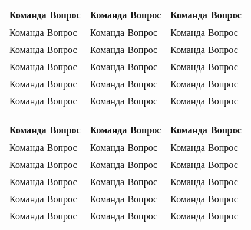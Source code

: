 
\usepackage{multicol}
\usepackage{tabularx}
\newdimen{\blankheight}
\newdimen{\blankwidth}
\newcommand{\cell}{\vspace{0.3em}\hspace{1.5em} Команда \hspace{\blankwidth} Вопрос \arabic{Questions}\stepcounter{Questions}\hspace{1.5em} \vspace{\blankheight}}

\begin{tabularx}{\textwidth}{>{\raggedright\arraybackslash}X|>{\raggedright\arraybackslash}X|>{\raggedright\arraybackslash}X}
\cell & \cell & \cell \\ \hline
\cell & \cell & \cell \\ \hline
\cell & \cell & \cell \\ \hline
\cell & \cell & \cell \\ \hline
\cell & \cell & \cell \\ \hline
\cell & \cell & \cell \\ \hline

\end{tabularx}
\clearpage
\begin{tabularx}{\textwidth}{>{\raggedright\arraybackslash}X|>{\raggedright\arraybackslash}X|>{\raggedright\arraybackslash}X}
\cell & \cell & \cell \\ \hline
\cell & \cell & \cell \\ \hline
\cell & \cell & \cell \\ \hline
\cell & \cell & \cell \\ \hline
\cell & \cell & \cell \\ \hline
\cell & \cell & \cell \\ \hline

\end{tabularx}


